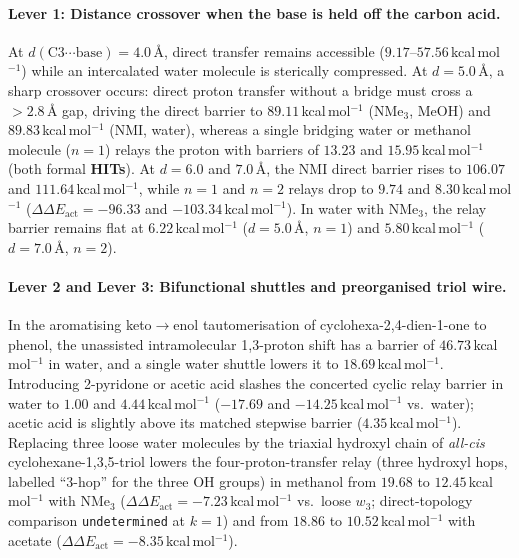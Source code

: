 \documentclass[11pt,a4paper]{article}
\begin{document}
\paragraph{Lever 1: Distance crossover when the base is held off the carbon acid.}
At $d(\text{C3}\cdots\text{base}) = 4.0$\,\AA{}, direct transfer remains accessible ($9.17$--$57.56$\,kcal\,mol$^{-1}$) while an intercalated water molecule is sterically compressed. At $d = 5.0$\,\AA{}, a sharp crossover occurs: direct proton transfer without a bridge must cross a $>2.8$\,\AA{} gap, driving the direct barrier to $89.11$\,kcal\,mol$^{-1}$ ($\text{NMe}_3$, MeOH) and $89.83$\,kcal\,mol$^{-1}$ (NMI, water), whereas a single bridging water or methanol molecule ($n=1$) relays the proton with barriers of $13.23$ and $15.95$\,kcal\,mol$^{-1}$ (both formal \textbf{HITs}). At $d = 6.0$ and $7.0$\,\AA{}, the NMI direct barrier rises to $106.07$ and $111.64$\,kcal\,mol$^{-1}$, while $n=1$ and $n=2$ relays drop to $\mathbf{9.74}$ and $\mathbf{8.30}$\,kcal\,mol$^{-1}$ ($\Delta\Delta E_{\text{act}} = -96.33$ and $-103.34$\,kcal\,mol$^{-1}$). In water with $\text{NMe}_3$, the relay barrier remains flat at $6.22$\,kcal\,mol$^{-1}$ ($d=5.0$\,\AA{}, $n=1$) and $5.80$\,kcal\,mol$^{-1}$ ($d=7.0$\,\AA{}, $n=2$).

\paragraph{Lever 2 and Lever 3: Bifunctional shuttles and preorganised triol wire.}
In the aromatising keto$\to$enol tautomerisation of cyclohexa-2,4-dien-1-one to phenol, the unassisted intramolecular 1,3-proton shift has a barrier of $46.73$\,kcal\,mol$^{-1}$ in water, and a single water shuttle lowers it to $18.69$\,kcal\,mol$^{-1}$. Introducing 2-pyridone or acetic acid slashes the concerted cyclic relay barrier in water to $\mathbf{1.00}$ and $\mathbf{4.44}$\,kcal\,mol$^{-1}$ ($-17.69$ and $-14.25$\,kcal\,mol$^{-1}$ vs.\ water); acetic acid is slightly above its matched stepwise barrier ($4.35$\,kcal\,mol$^{-1}$). Replacing three loose water molecules by the triaxial hydroxyl chain of \textit{all-cis} cyclohexane-1,3,5-triol lowers the four-proton-transfer relay (three hydroxyl hops, labelled ``3-hop'' for the three OH groups) in methanol from $19.68$ to $\mathbf{12.45}$\,kcal\,mol$^{-1}$ with $\text{NMe}_3$ ($\Delta\Delta E_{\text{act}} = -7.23$\,kcal\,mol$^{-1}$ vs.\ loose $w_3$; direct-topology comparison \texttt{undetermined} at $k=1$) and from $18.86$ to $\mathbf{10.52}$\,kcal\,mol$^{-1}$ with acetate ($\Delta\Delta E_{\text{act}} = -8.35$\,kcal\,mol$^{-1}$).
\end{document}
